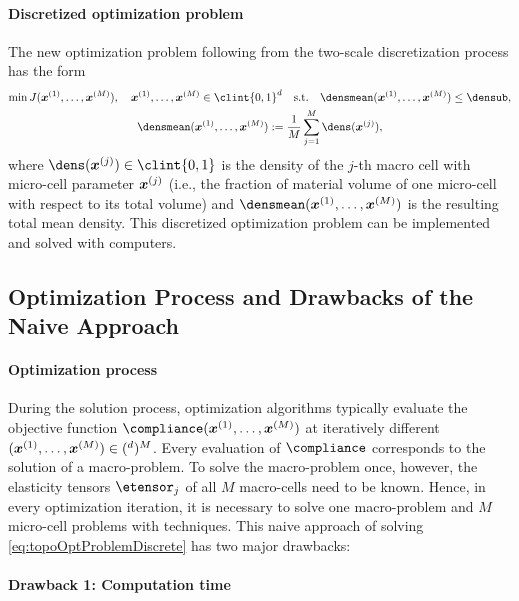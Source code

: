 \paragraph{Discretized optimization problem}

The new optimization problem following from the
two-scale discretization process has the form
\begin{subequations}
  \label{eq:topoOptProblemDiscrete}
  \begin{gather}
    \min J(\*x^{(1)}, \dotsc, \*x^{(M)}),\quad
    \*x^{(1)}, \dotsc, \*x^{(M)} \in \clint{0, 1}^d
    \quad\text{s.t.}\quad
    \densmean(\*x^{(1)}, \dotsc, \*x^{(M)}) \le \densub,\\
    \densmean(\*x^{(1)}, \dotsc, \*x^{(M)})
    := \frac{1}{M} \sum_{j=1}^M \dens(\*x^{(j)}),
  \end{gather}
\end{subequations}
where $\dens(\*x^{(j)}) \in \clint{0, 1}$ is the
density of the $j$-th macro cell with micro-cell parameter ${\boldsymbol{x}}^{(j)}$
(i.e., the fraction of material volume of one micro-cell
with respect to its total volume)
and $\densmean(\*x^{(1)}, \dotsc, \*x^{(M)})$ is the resulting
total mean density.
This discretized optimization problem can be implemented and
solved with computers.

\subsection{Optimization Process and Drawbacks of the Naive Approach}
\label{sec:613optimization}

\paragraph{Optimization process}

During the solution process, optimization algorithms typically
evaluate the objective function $\compliance(\*x^{(1)}, \dotsc, \*x^{(M)})$
at iteratively different 
$(\*x^{(1)}, \dotsc, \*x^{(M)}) \in (\real^d)^M$.
Every evaluation of $\compliance$ corresponds to the solution of a
macro-problem.
To solve the macro-problem once, however, the elasticity tensors
$\etensor_j$ of all $M$ macro-cells need to be known.
Hence, in every optimization iteration, it is necessary to solve
one macro-problem and $M$ micro-cell problems with \fem techniques.
This naive approach of solving \eqref{eq:topoOptProblemDiscrete}
has two major drawbacks:

\paragraph{Drawback 1: Computation time}

